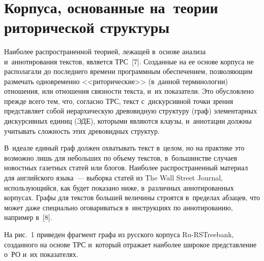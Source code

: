 \begin{multicols}{2}
\begin{figure*} %
\vspace*{1pt}
  \begin{center}  
    \mbox{%
\epsfxsize=161.735mm
}

\end{center}
\vspace*{-6pt}
\vspace*{3pt}
\end{figure*}

\section{Корпуса, основанные на~теории риторической структуры}

    Наиболее распространенной теорией, лежащей в~основе анализа 
    и~аннотирования текс\-тов, является ТРС~[7]. Созданные 
на ее основе корпуса не располагали до последнего времени программным 
обеспечением, позволяющим размечать одновременно <<риторические>> 
(в~данной терминологии) отношения, или отношения связности текста, и~их 
показатели. Это обусловлено прежде всего тем, что, согласно ТРС, текст 
с~дискурсивной точки зрения пред\-став\-ля\-ет собой иерархическую древовидную 
структуру (граф) элементарных дискурсивных единиц (ЭДЕ), которыми являются 
клаузы, и~аннотации должны учитывать слож\-ность этих древовидных структур. 

В~идеале единый граф должен охватывать текст в~целом, но на практике это 
возможно лишь для небольших по объему текс\-тов, в~большинстве случаев 
новостных газетных статей или блогов. Наиболее распространенный материал для 
английского языка~--- выборка статей из The Wall Street Journal, использующийся, 
как будет показано ниже, в~различных аннотированных корпусах. Графы для 
текстов большей величины строятся в~пределах абзацев, что 
может даже специально оговариваться в~инструкциях по аннотированию, 
например в~[8]. 
{

}

На рис.~1 приведен фраг\-мент графа из русского корпуса  
Ru-RSTreebank, соз\-дан\-но\-го на основе ТРС и~который отражает наиболее широкое 
представление о~РО и~их показателях. 





\end{multicols}

